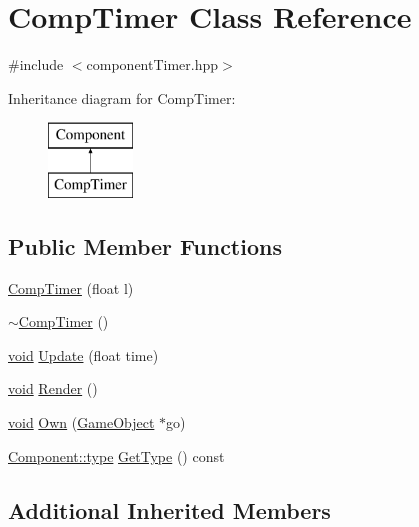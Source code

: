 \hypertarget{class_comp_timer}{\section{Comp\-Timer Class Reference}
\label{class_comp_timer}
}


{\ttfamily \#include $<$component\-Timer.\-hpp$>$}

Inheritance diagram for Comp\-Timer\-:\begin{figure}[H]
\begin{center}
\leavevmode
\includegraphics[height=2.000000cm]{class_comp_timer}
\end{center}
\end{figure}
\subsection*{Public Member Functions}
\begin{DoxyCompactItemize}
\item 
\hyperlink{class_comp_timer_a42e3895baea9f3bd1c75e88dea280843}{Comp\-Timer} (float l)
\item 
\hyperlink{class_comp_timer_a93ee349dbfed7c5cf6d4181f963bd2b8}{$\sim$\-Comp\-Timer} ()
\item 
\hyperlink{_s_d_l__opengles2__gl2ext_8h_ae5d8fa23ad07c48bb609509eae494c95}{void} \hyperlink{class_comp_timer_a6d5a7782297956042ba4dd8eb20a42fc}{Update} (float time)
\item 
\hyperlink{_s_d_l__opengles2__gl2ext_8h_ae5d8fa23ad07c48bb609509eae494c95}{void} \hyperlink{class_comp_timer_acdf498b351f60ce88f2b1ca8c91c2338}{Render} ()
\item 
\hyperlink{_s_d_l__opengles2__gl2ext_8h_ae5d8fa23ad07c48bb609509eae494c95}{void} \hyperlink{class_comp_timer_aaab87f070ccd03302dd8028a8ad8a9d1}{Own} (\hyperlink{class_game_object}{Game\-Object} $\ast$go)
\item 
\hyperlink{class_component_ad6d161b6acf7b843b55bb9feac7af71a}{Component\-::type} \hyperlink{class_comp_timer_a6e1db211f4104879a1f36cb82320663c}{Get\-Type} () const 
\end{DoxyCompactItemize}
\subsection*{Additional Inherited Members}


